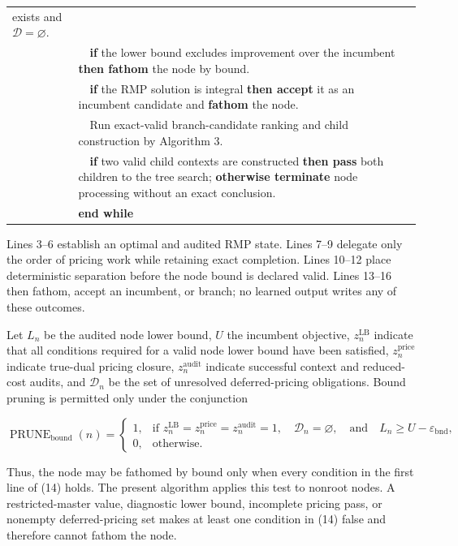 \documentclass[
  11pt,
]{article}
\begin{document}
\begin{longtable}[]{@{}
  >{\raggedleft\arraybackslash}p{}
  >{\raggedright\arraybackslash}p{}@{}}
exists and \(\mathcal{D}=\varnothing\). \\
13 & \(\quad\)\textbf{if} the lower bound excludes improvement over the
incumbent \textbf{then fathom} the node by bound. \\
14 & \(\quad\)\textbf{if} the RMP solution is integral \textbf{then
accept} it as an incumbent candidate and \textbf{fathom} the node. \\
15 & \(\quad\)Run exact-valid branch-candidate ranking and child
construction by Algorithm 3. \\
16 & \(\quad\)\textbf{if} two valid child contexts are constructed
\textbf{then pass} both children to the tree search; \textbf{otherwise
terminate} node processing without an exact conclusion. \\
17 & \textbf{end while} \\
\end{longtable}

Lines 3--6 establish an optimal and audited RMP state. Lines 7--9
delegate only the order of pricing work while retaining exact
completion. Lines 10--12 place deterministic separation before the node
bound is declared valid. Lines 13--16 then fathom, accept an incumbent,
or branch; no learned output writes any of these outcomes.

Let \(L_n\) be the audited node lower bound, \(U\) the incumbent
objective, \(z_n^{\mathrm{LB}}\) indicate that all conditions required
for a valid node lower bound have been satisfied,
\(z_n^{\mathrm{price}}\) indicate true-dual pricing closure,
\(z_n^{\mathrm{audit}}\) indicate successful context and reduced-cost
audits, and \(\mathcal{D}_n\) be the set of unresolved deferred-pricing
obligations. Bound pruning is permitted only under the conjunction

\[
\operatorname{PRUNE}_{\mathrm{bound}}(n)
=
\begin{cases}
1, &
\text{if }
z_n^{\mathrm{LB}}=z_n^{\mathrm{price}}=z_n^{\mathrm{audit}}=1,\quad
\mathcal{D}_n=\varnothing,\quad \text{and}\quad
L_n\ge U-\varepsilon_{\mathrm{bnd}},\\
0, & \text{otherwise}.
\end{cases}
\tag{14}
\]

Thus, the node may be fathomed by bound only when every condition in the
first line of (14) holds. The present algorithm applies this test to
nonroot nodes. A restricted-master value, diagnostic lower bound,
incomplete pricing pass, or nonempty deferred-pricing set makes at least
one condition in (14) false and therefore cannot fathom the node.
\end{document}
